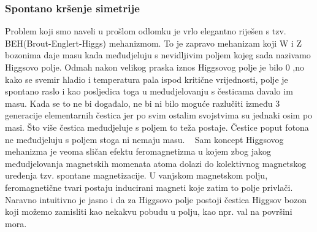 \documentclass[12pt,a4paper,oneside]{article}
\begin{document}
\begin{linenumbers}
		
		
		\subsubsection{Spontano kršenje simetrije}
		Problem koji smo naveli u prošlom odlomku je vrlo elegantno riješen s tzv. BEH(Brout-Englert-Higgs) mehanizmom. To je zapravo mehanizam koji W i Z bozonima daje masu kada međudjeluju s nevidljivim poljem kojeg sada nazivamo Higgsovo polje. 
		Odmah nakon velikog praska iznos Higgsovog polje je bilo 0 ,no kako se svemir hladio i temperatura pala ispod kritične vrijednosti, polje je spontano raslo i kao posljedica toga u međudjelovanju s česticama davalo im masu. Kada se to ne bi događalo, ne bi ni bilo moguće razlučiti između 3 generacije elementarnih čestica jer po svim ostalim svojstvima su jednaki osim po masi. Što više čestica međudjeluje s poljem to teža postaje. Čestice poput fotona ne međudjeluju s poljem stoga ni nemaju masu. ~\cite{cernweb}
		Sam koncept Higgsovog mehanizma je veoma sličan efektu feromagnetizma u kojem zbog jakog međudjelovanja magnetskih momenata atoma dolazi do kolektivnog magnetskog uređenja tzv. spontane magnetizacije. U  vanjskom magnetskom polju, feromagnetične tvari postaju inducirani magneti koje zatim to polje privlači.  
		Naravno intuitivno je jasno i da za Higgsovo polje postoji čestica Higgsov bozon koji možemo zamisliti kao nekakvu pobudu u polju, kao npr. val na površini mora. ~\cite{cernweb}
		

\end{linenumbers}
\end{document}
